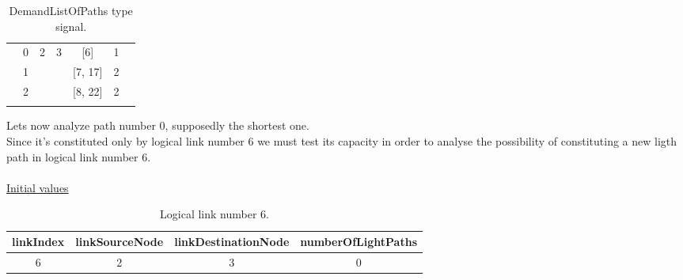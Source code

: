 \begin{table}[H]
\begin{tabular}{|lcccccl|}
		\multicolumn{1}{|l|}{} & \multicolumn{1}{c|}{0} & \multicolumn{1}{c|}{\multirow{3}{*}{2}} & \multicolumn{1}{c|}{\multirow{3}{*}{3}} & \multicolumn{1}{c|}{{[}6{]}} & \multicolumn{1}{c|}{1}                                                                                   &  \\ \cline{2-2} \cline{5-6}
		\multicolumn{1}{|l|}{} & \multicolumn{1}{c|}{1}          & \multicolumn{1}{c|}{}                       & \multicolumn{1}{c|}{}                       & \multicolumn{1}{c|}{{[}7, 17{]}} & \multicolumn{1}{c|}{2}                                                                                   &  \\ \cline{2-2} \cline{5-6}
		\multicolumn{1}{|l|}{} & \multicolumn{1}{c|}{2} & \multicolumn{1}{c|}{}                       & \multicolumn{1}{c|}{}                       & \multicolumn{1}{c|}{{[}8, 22{]}} & \multicolumn{1}{c|}{2}                                                                                   &  \\ \cline{2-6}
		& \multicolumn{1}{l}{}              & \multicolumn{1}{l}{}                        & \multicolumn{1}{l}{}                        & \multicolumn{1}{l}{}                 & \multicolumn{1}{l}{}                                                                                         &  \\ \hline
	\end{tabular}
	\caption{DemandListOfPaths type signal.}
	\label{demandListOfPaths_example}
\end{table}

Lets now analyze path number 0, supposedly the shortest one.\\


Since it's constituted only by logical link number 6 we must test its capacity in order to analyse the possibility of constituting a new ligth path in logical link number 6.	\\
\\
\underline{Initial values}\\
\begin{table}[H]
	\centering
	\begin{tabular}{|c|c|c|c|}
		\hline
		linkIndex & linkSourceNode & linkDestinationNode & numberOfLightPaths \\ \hline
		6     & 2           & 3                 & 0                \\  \hline
	\end{tabular}
	\caption{Logical link number 6.}
	\label{logicalLink_variable}
\end{table}

